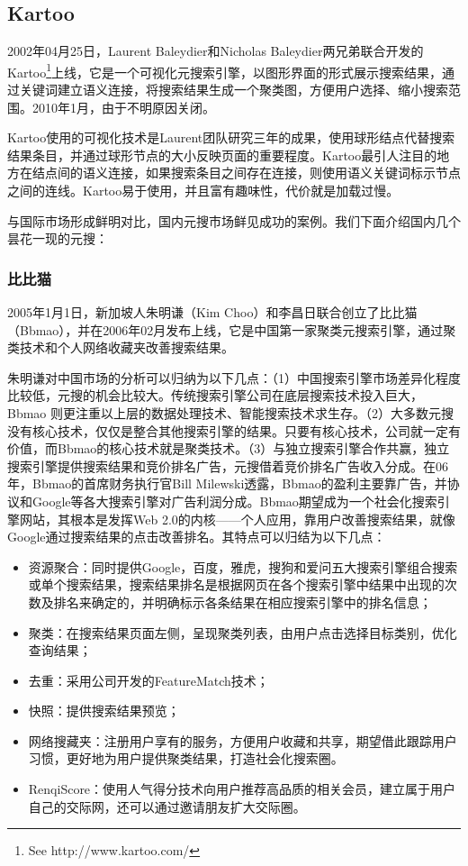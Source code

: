 \subsection{Kartoo}
2002年04月25日，Laurent Baleydier和Nicholas Baleydier两兄弟联合开发的Kartoo\footnote{See http://www.kartoo.com/}上线，它是一个可视化元搜索引擎，以图形界面的形式展示搜索结果，通过关键词建立语义连接，将搜索结果生成一个聚类图，方便用户选择、缩小搜索范围。2010年1月，由于不明原因关闭。

Kartoo使用的可视化技术是Laurent团队研究三年的成果，使用球形结点代替搜索结果条目，并通过球形节点的大小反映页面的重要程度。Kartoo最引人注目的地方在结点间的语义连接，如果搜索条目之间存在连接，则使用语义关键词标示节点之间的连线。Kartoo易于使用，并且富有趣味性，代价就是加载过慢。

与国际市场形成鲜明对比，国内元搜市场鲜见成功的案例。我们下面介绍国内几个昙花一现的元搜：
\subsubsection{比比猫}
2005年1月1日，新加坡人朱明谦（Kim Choo）和李昌日联合创立了比比猫（Bbmao），并在2006年02月发布上线，它是中国第一家聚类元搜索引擎，通过聚类技术和个人网络收藏夹改善搜索结果。

朱明谦对中国市场的分析可以归纳为以下几点：（1）中国搜索引擎市场差异化程度比较低，元搜的机会比较大。传统搜索引擎公司在底层搜索技术投入巨大，Bbmao 则更注重以上层的数据处理技术、智能搜索技术求生存。（2）大多数元搜没有核心技术，仅仅是整合其他搜索引擎的结果。只要有核心技术，公司就一定有价值，而Bbmao的核心技术就是聚类技术。（3）与独立搜索引擎合作共赢，独立搜索引擎提供搜索结果和竞价排名广告，元搜借着竞价排名广告收入分成。在06年，Bbmao的首席财务执行官Bill Milewski透露，Bbmao的盈利主要靠广告，并协议和Google等各大搜索引擎对广告利润分成。Bbmao期望成为一个社会化搜索引擎网站，其根本是发挥Web 2.0的内核——个人应用，靠用户改善搜索结果，就像Google通过搜索结果的点击改善排名。其特点可以归结为以下几点：
\begin{itemize}
  \item 资源聚合：同时提供Google，百度，雅虎，搜狗和爱问五大搜索引擎组合搜索或单个搜索结果，搜索结果排名是根据网页在各个搜索引擎中结果中出现的次数及排名来确定的，并明确标示各条结果在相应搜索引擎中的排名信息；
  \item 聚类：在搜索结果页面左侧，呈现聚类列表，由用户点击选择目标类别，优化查询结果；
  \item 去重：采用公司开发的FeatureMatch技术；
  \item 快照：提供搜索结果预览；
  \item 网络搜藏夹：注册用户享有的服务，方便用户收藏和共享，期望借此跟踪用户习惯，更好地为用户提供聚类结果，打造社会化搜索圈。
  \item RenqiScore：使用人气得分技术向用户推荐高品质的相关会员，建立属于用户自己的交际网，还可以通过邀请朋友扩大交际圈。
\end{itemize}

